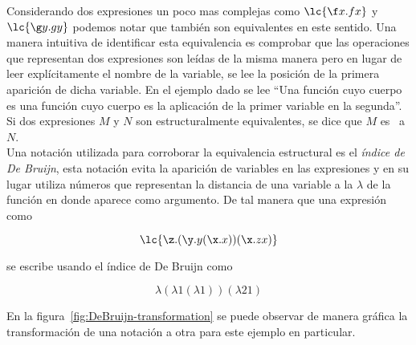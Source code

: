 Considerando dos expresiones un poco mas complejas como \(\lc{\f x.f x}\) y
\(\lc{\g y.g y}\) podemos notar que también son equivalentes en este sentido.
Una manera intuitiva de identificar esta equivalencia es comprobar que las
operaciones que representan dos expresiones son leídas de la misma manera pero
en lugar de leer explícitamente el nombre de la variable, se lee la posición de
la primera aparición de dicha variable. En el ejemplo dado se lee ``Una función cuyo
cuerpo es una función cuyo cuerpo es la aplicación de la primer variable en la
segunda''. Si dos expresiones \(M\) y \(N\) son estructuralmente equivalentes,
se dice que \(M\) es \alphacong~a \(N\).\\

Una notación utilizada para corroborar la equivalencia estructural es el
\emph{índice de De Bruijn}, esta notación evita la aparición de variables en las
expresiones y en su lugar utiliza números que representan la distancia de una
variable a la \(\lambda\) de la función en donde aparece como argumento. De tal
manera que una expresión como

\begin{equation}\label{eq:2.1}
  \lc{\z.(\y.y (\x.x))(\x. z x)}
\end{equation}

se escribe usando el índice de De Bruijn como

\begin{equation}\label{eq:2.2}
  \lambda (\lambda 1 (\lambda 1)) (\lambda 2 1)
\end{equation}

En la figura~\ref{fig:DeBruijn-transformation} se puede observar de manera
gráfica la transformación de una notación a otra para este ejemplo en
particular.\\

